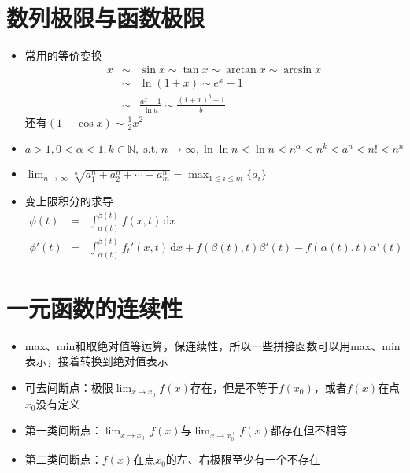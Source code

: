 \documentclass[UTF8]{ctexart}
\newcommand{\ud}{\,\mathrm{d}}
\DeclareMathOperator{\st}{s.t.}
\begin{document}
\section{数列极限与函数极限}
\begin{itemize}

\item 常用的等价变换
\begin{eqnarray*}
x&\sim& \sin x \sim \tan x \sim \arctan x \sim \arcsin x\\
&\sim& \ln(1+x) \sim e^x-1\\
&\sim&\frac{a^x-1}{\ln a} \sim \frac{(1+x)^b-1}{b}
\end{eqnarray*}
还有$(1-\cos x)\sim \frac{1}{2}x^2$

\item $a>1,0<\alpha<1,k \in \mathbb{N},\st n\to \infty,\ln\ln n <\ln n < n^\alpha < n^k <a^n < n! < n^n $

\item $\lim_{n \to \infty}\sqrt[n]{a_1^n+a_2^n+\cdots+a_m^n} = \max_{1\leq i \leq m}\{a_i\}$

\item 变上限积分的求导
\begin{eqnarray*}
\phi(t) & = & \int_{\alpha (t)}^{\beta (t)} f(x,t) \ud x\\
\phi'(t) & = & \int_{\alpha (t)}^{\beta (t)} f_t'(x,t) \ud x + f(\beta (t),t)\beta' (t)- f(\alpha (t),t)\alpha' (t)
\end{eqnarray*}
\end{itemize}


\section{一元函数的连续性}
\begin{itemize}


\item max、min和取绝对值等运算，保连续性，所以一些拼接函数可以用max、min表示，接着转换到绝对值表示

\item 可去间断点：极限$\lim_{x\rightarrow x_0} f(x)$存在，但是不等于$f(x_0)$，或者$f(x)$在点$x_0$没有定义

\item 第一类间断点：$\lim_{x\rightarrow x_0^-} f(x)$与$\lim_{x\rightarrow x_0^+} f(x)$都存在但不相等

\item 第二类间断点：$f(x)$在点$x_0$的左、右极限至少有一个不存在


\end{itemize}
\end{document}
